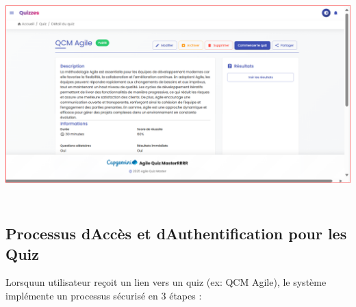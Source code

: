 \documentclass[12pt,a4paper,twoside]{report}
\begin{document}
\includegraphics[width=6.3in,height=3.24097in]{latex_media/media/image60.png}

\hypertarget{processus-daccuxe8s-et-dauthentification-pour-les-quiz}{%
\subsection{Processus d\textquotesingle Accès et
d\textquotesingle Authentification pour les
Quiz}\label{processus-daccuxe8s-et-dauthentification-pour-les-quiz}}

Lorsqu\textquotesingle un utilisateur reçoit un lien vers un quiz (ex:
QCM Agile), le système implémente un processus sécurisé en 3 étapes :
\end{document}
